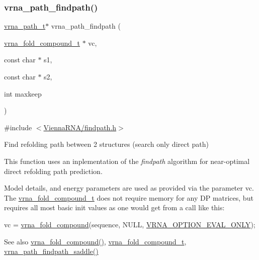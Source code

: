 \subsubsection{\texorpdfstring{vrna\+\_\+path\+\_\+findpath()}{vrna\_path\_findpath()}}
{\footnotesize\ttfamily \hyperlink{group__direct__paths_ga818d4f3d1cf8723d6905990b08d909fe}{vrna\+\_\+path\+\_\+t}$\ast$ vrna\+\_\+path\+\_\+findpath (\begin{DoxyParamCaption}\item[{\hyperlink{group__fold__compound_ga1b0cef17fd40466cef5968eaeeff6166}{vrna\+\_\+fold\+\_\+compound\+\_\+t} $\ast$}]{vc,  }\item[{const char $\ast$}]{s1,  }\item[{const char $\ast$}]{s2,  }\item[{int}]{maxkeep }\end{DoxyParamCaption})}



{\ttfamily \#include $<$\hyperlink{findpath_8h}{Vienna\+R\+N\+A/findpath.\+h}$>$}



Find refolding path between 2 structures (search only direct path) 

This function uses an inplementation of the {\itshape findpath} algorithm \cite{flamm:2001} for near-\/optimal direct refolding path prediction.

Model details, and energy parameters are used as provided via the parameter \textquotesingle{}vc\textquotesingle{}. The \hyperlink{group__fold__compound_ga1b0cef17fd40466cef5968eaeeff6166}{vrna\+\_\+fold\+\_\+compound\+\_\+t} does not require memory for any DP matrices, but requires all most basic init values as one would get from a call like this\+: 
\begin{DoxyCode}
vc = \hyperlink{group__fold__compound_ga6601d994ba32b11511b36f68b08403be}{vrna\_fold\_compound}(sequence, NULL, \hyperlink{group__fold__compound_ga61469c423131552c8483229f8b6c7e0e}{VRNA\_OPTION\_EVAL\_ONLY});
\end{DoxyCode}


\begin{DoxySeeAlso}{See also}
\hyperlink{group__fold__compound_ga6601d994ba32b11511b36f68b08403be}{vrna\+\_\+fold\+\_\+compound()}, \hyperlink{group__fold__compound_ga1b0cef17fd40466cef5968eaeeff6166}{vrna\+\_\+fold\+\_\+compound\+\_\+t}, \hyperlink{group__direct__paths_ga957922acc1bcaa97f52cbd0975f7dcd0}{vrna\+\_\+path\+\_\+findpath\+\_\+saddle()}
\end{DoxySeeAlso}

